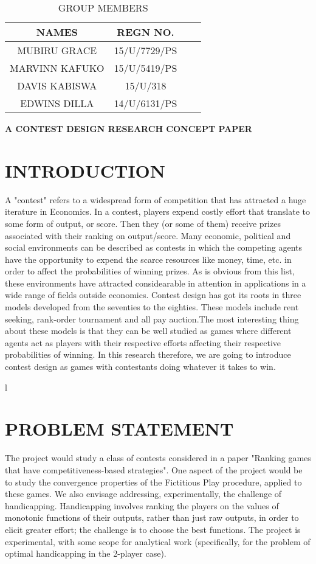 \documentclass{article}
\begin{document}
\begin{table}[ht]
\caption{GROUP MEMBERS}
\centering
\begin{tabular}{c c c c}
\hline
NAMES & REGN NO.\\
\hline
MUBIRU GRACE &15/U/7729/PS \\
MARVINN KAFUKO &15/U/5419/PS \\
DAVIS KABISWA & 15/U/318 \\
EDWINS DILLA & 14/U/6131/PS \\ 
\hline
\end{tabular}
\label {table:nonlin}
\end{table}
\textbf{A CONTEST DESIGN RESEARCH CONCEPT PAPER }
\section{\textbf{INTRODUCTION}}
A "contest" refers to a widespread form of competition that has attracted a huge iterature in Economics. In a contest, players expend costly effort that translate to some  form of output, or score. Then they (or some of them) receive prizes associated with their ranking on output/score. 
Many economic, political and social environments can be described as contests in which the competing agents have the opportunity to expend the scarce resources like money, time, etc. in order to affect the probabilities of winning prizes.
As is obvious from this list, these environments have attracted considearable in attention in applications in a wide range of fields outside economics.
Contest design has got its roots in three models developed  from the seventies to the eighties. These models include rent seeking, rank-order tournament and all pay auction.The most interesting thing about these models is that they can be well studied as games where different agents act as players with their respective efforts affecting their respective probabilities of winning.
In this research therefore, we are going to introduce contest design as games with contestants doing whatever it takes to win.

l
\section{\textbf{PROBLEM STATEMENT}}
The project would study a class of contests considered in a paper "Ranking games that have competitiveness-based strategies". One aspect of the project would be to study the convergence properties of the Fictitious Play procedure, applied to these games. We also envisage addressing, experimentally, the challenge of handicapping. Handicapping involves ranking the players on the values of monotonic functions of their outputs, rather than just raw outputs, in order to elicit greater effort; the challenge is to choose the best functions. The project is experimental, with some scope for analytical work (specifically, for the problem of optimal handicapping in the 2-player case).
\end{document}
